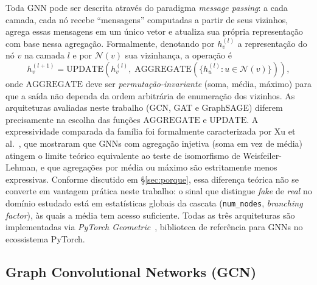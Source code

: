 Toda GNN pode ser descrita atrav\'es do paradigma \emph{message
passing}: a cada camada, cada n\'o recebe ``mensagens'' computadas a
partir de seus vizinhos, agrega essas mensagens em um \'unico vetor e
atualiza sua pr\'opria representa\c{c}\~ao com base nessa
agrega\c{c}\~ao. Formalmente, denotando por $h_v^{(l)}$ a
representa\c{c}\~ao do n\'o $v$ na camada $l$ e por $\mathcal{N}(v)$
sua vizinhan\c{c}a, a opera\c{c}\~ao \'e
\begin{equation}
h_v^{(l+1)} = \mathrm{UPDATE}\!\left( h_v^{(l)},\;
\mathrm{AGGREGATE}\!\left( \{ h_u^{(l)} : u \in \mathcal{N}(v) \} \right) \right),
\label{eq:message_passing}
\end{equation}
onde $\mathrm{AGGREGATE}$ deve ser \emph{permuta\c{c}\~ao-invariante}
(soma, m\'edia, m\'aximo) para que a sa\'ida n\~ao dependa da ordem
arbitr\'aria de enumera\c{c}\~ao dos vizinhos. As arquiteturas avaliadas
neste trabalho (GCN, GAT e GraphSAGE) diferem precisamente na
escolha das fun\c{c}\~oes $\mathrm{AGGREGATE}$ e $\mathrm{UPDATE}$. A
expressividade comparada da fam\'ilia foi formalmente caracterizada
por Xu et al.~\cite{xu2019gin}, que mostraram que GNNs com
agrega\c{c}\~ao injetiva (soma em vez de m\'edia) atingem o limite
te\'orico equivalente ao teste de isomorfismo de Weisfeiler-Lehman, e
que agrega\c{c}\~oes por m\'edia ou m\'aximo s\~ao estritamente menos
expressivas. Conforme discutido em \S\ref{sec:porque}, essa diferen\c{c}a
te\'orica n\~ao se converte em vantagem pr\'atica neste trabalho: o
sinal que distingue \emph{fake} de \emph{real} no dom\'inio estudado est\'a
em estat\'isticas globais da cascata (\texttt{num\_nodes},
\emph{branching factor}), \`as quais a m\'edia tem acesso suficiente.
Todas as tr\^es arquiteturas s\~ao implementadas via
\emph{PyTorch Geometric}~\cite{fey2019pyg}, biblioteca de refer\^encia
para GNNs no ecossistema PyTorch.

\subsection{Graph Convolutional Networks (GCN)}
\label{sec:gcn}

